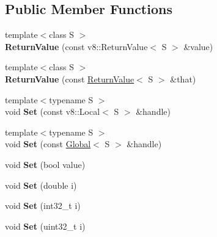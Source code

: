 \subsection*{Public Member Functions}
\begin{DoxyCompactItemize}
\item 
\mbox{\label{class_return_value_a2ff9626e4e10b43b73dd330a874d11e2}} 
{\footnotesize template$<$class S $>$ }\\{\bfseries Return\+Value} (const v8\+::\+Return\+Value$<$ S $>$ \&value)
\item 
\mbox{\label{class_return_value_a5d8901ddad32bc895f1cadbe6bae43c8}} 
{\footnotesize template$<$class S $>$ }\\{\bfseries Return\+Value} (const \hyperlink{class_return_value}{Return\+Value}$<$ S $>$ \&that)
\item 
\mbox{\label{class_return_value_a52598063029ad6ee4c8fde58a59b4e0a}} 
{\footnotesize template$<$typename S $>$ }\\void {\bfseries Set} (const v8\+::\+Local$<$ S $>$ \&handle)
\item 
\mbox{\label{class_return_value_a20898a6aa3a7b0827909318becec4029}} 
{\footnotesize template$<$typename S $>$ }\\void {\bfseries Set} (const \hyperlink{class_global}{Global}$<$ S $>$ \&handle)
\item 
\mbox{\label{class_return_value_a9b042e86dc824f42ed8fd3125af38f2d}} 
void {\bfseries Set} (bool value)
\item 
\mbox{\label{class_return_value_acbf15a008ec49552698a0aa92d4d59a6}} 
void {\bfseries Set} (double i)
\item 
\mbox{\label{class_return_value_ab98f791742444327656f207dcc430f1e}} 
void {\bfseries Set} (int32\+\_\+t i)
\item 
\mbox{\label{class_return_value_a2cab3e0dfa8d260d14ed44b7f92f356b}} 
void {\bfseries Set} (uint32\+\_\+t i)
\item 
\mbox{\label{class_return_value_a812f2968e323bb9315c37d727973cbdc}} 

\end{DoxyCompactItemize}
